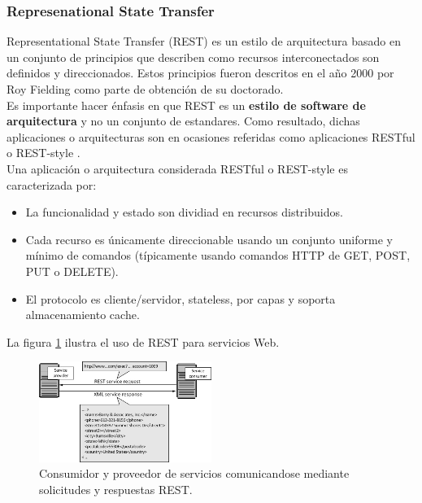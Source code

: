 \subsubsection{Represenational State Transfer}

Representational State Transfer (REST) es un estilo de arquitectura basado en un conjunto de principios que describen como recursos interconectados son definidos y direccionados. Estos principios fueron descritos en el año 2000 por Roy Fielding como parte de obtención de su doctorado.
\\
Es importante hacer énfasis en que REST es un \textbf{estilo de software de arquitectura} y no un conjunto de estandares. Como resultado, dichas aplicaciones o arquitecturas son en ocasiones referidas como aplicaciones RESTful o REST-style \cite{restArticle}. 
\\
Una aplicación o arquitectura considerada RESTful o REST-style es caracterizada por:
\begin{itemize}
	\item La funcionalidad y estado son dividiad en recursos distribuidos.
	\item Cada recurso es únicamente direccionable usando un conjunto uniforme y mínimo de comandos (típicamente usando comandos HTTP de GET, POST, PUT o DELETE).
	\item El protocolo es cliente/servidor, stateless, por capas y soporta almacenamiento cache.
\end{itemize} 
 La figura \ref{fig:rest_mess} ilustra el uso de REST para servicios Web.
\begin{figure}[H]
	\centering
	\includegraphics[width=0.5\textwidth]{capitulo2/images/rest_messages.jpg}
	\caption{Consumidor y proveedor de servicios comunicandose mediante solicitudes y respuestas REST.}
	\label{fig:rest_mess}
\end{figure}  
